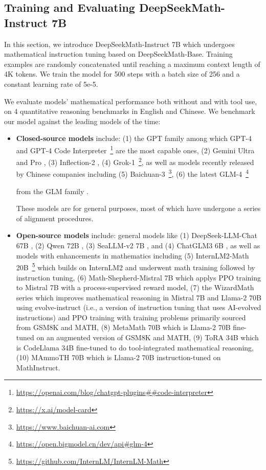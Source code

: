\subsection{Training and Evaluating DeepSeekMath-Instruct 7B}

In this section, we introduce DeepSeekMath-Instruct 7B which undergoes mathematical instruction tuning based on DeepSeekMath-Base. Training examples are randomly concatenated until reaching a maximum context length of 4K tokens. We train the model for 500 steps with a batch size of 256 and a constant learning rate of 5e-5.

We evaluate models' mathematical performance both without and with tool use, on 4 quantitative reasoning benchmarks in English and Chinese. We benchmark our model against the leading models of the time:

\begin{itemize}[topsep=0pt]
    \item \textbf{Closed-source models} include: (1) the GPT family among which GPT-4 \citep{gpt4} and GPT-4 Code Interpreter~\footnote{\url{https://openai.com/blog/chatgpt-plugins\#\#code-interpreter}} are the most capable ones, (2) Gemini Ultra and Pro \citep{gemini}, (3) Inflection-2 \citep{inflection-2}, (4) Grok-1~\footnote{\url{https://x.ai/model-card}},
    as well as models recently released by Chinese companies including (5) Baichuan-3~\footnote{\url{https://www.baichuan-ai.com}},
    (6) the latest GLM-4~\footnote{\url{https://open.bigmodel.cn/dev/api\#glm-4}}

    from the GLM family \citep{glm}.

    These models are for general purposes, most of which have undergone a series of alignment procedures.
    \item \textbf{Open-source models} include: general models like (1) DeepSeek-LLM-Chat 67B \citep{deepseek-llm}, (2) Qwen 72B \citep{qwen}, (3) SeaLLM-v2 7B \citep{seallm}, and (4) ChatGLM3 6B \citep{chatglm3}, as well as models with enhancements in mathematics including (5) InternLM2-Math 20B~\footnote{\url{https://github.com/InternLM/InternLM-Math}} which builds on InternLM2 and underwent math training followed by instruction tuning, (6) Math-Shepherd-Mistral 7B which applys PPO training \citep{schulman2017proximal} to Mistral 7B \citep{mistral} with a process-supervised reward model, (7) the WizardMath series \citep{wizardmath} which improves mathematical reasoning in Mistral 7B and Llama-2 70B \citep{llama2} using evolve-instruct (i.e., a version of instruction tuning that uses AI-evolved instructions) and PPO training with training problems primarily sourced from GSM8K and MATH, (8) MetaMath 70B \citep{metamath} which is Llama-2 70B fine-tuned on an augmented version of GSM8K and MATH, (9) ToRA 34B \cite{tora} which is CodeLlama 34B fine-tuned to do tool-integrated mathematical reasoning, (10) MAmmoTH 70B \citep{MathInstruct} which is Llama-2 70B instruction-tuned on MathInstruct.
\end{itemize}

